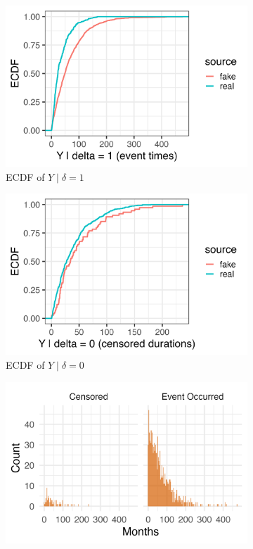 \begin{figure}[H]
\centering
\begin{subfigure}[t]{0.3\textwidth}
  \centering
  \includegraphics[width=\linewidth]{images/ppc_event_ecdf_A1000.png}  %
  \caption{{\small ECDF of $Y \mid \delta=1$}}
  \label{fig:ecdf-event_a1000}
\end{subfigure}\hfill
\begin{subfigure}[t]{0.3\textwidth}
  \centering
  \includegraphics[width=\linewidth]{images/ppc_censored_ecdf_A1000.png} 
  \caption{{\small ECDF of $Y \mid \delta=0$}}
  \label{fig:ecdf-cens_a1000}
\end{subfigure}\hfill
\begin{subfigure}[t]{0.37\textwidth}
  \centering
  \includegraphics[width=\linewidth]{images/fake_duration_hist_a1000.png}   %

\end{subfigure}
\end{figure}
